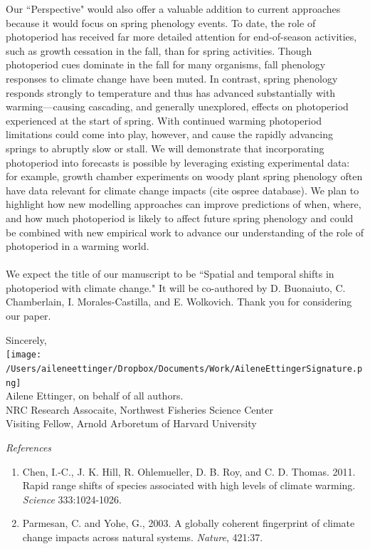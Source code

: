 \documentclass[10.5pt,a4paper]{letter}
\begin{document}
\begin{letter}{}
Our ``Perspective" would also offer a valuable addition to current approaches because it would focus on spring phenology events. To date, the role of photoperiod has received far more detailed attention for end-of-season activities, such as growth cessation in the fall, than for spring activities. Though photoperiod cues dominate in the fall for many organisms, fall phenology responses to climate change have been muted. In contrast, spring phenology responds strongly to temperature and thus has advanced substantially with warming---causing cascading, and generally unexplored, effects on photoperiod experienced at the start of spring. With continued warming photoperiod limitations could come into play, however, and cause the rapidly advancing springs to abruptly slow or stall. We will demonstrate that incorporating photoperiod into forecasts is possible by leveraging existing experimental data: for example, growth chamber experiments on woody plant spring phenology often have data relevant for climate change impacts (cite ospree database). We plan to highlight how new modelling approaches can improve predictions of when, where, and how much photoperiod is likely to affect future spring phenology and could be combined with new empirical work to advance our understanding of the role of photoperiod in a warming world. 
\\
\\
We expect the title of our manuscript to be ``Spatial and temporal shifts in photoperiod with climate change."  It will be co-authored by D. Buonaiuto, C. Chamberlain, I. Morales-Castilla, and E. Wolkovich. Thank you for considering our paper.

Sincerely,\\

\texttt{[image: /Users/aileneettinger/Dropbox/Documents/Work/AileneEttingerSignature.png]} \\
Ailene Ettinger, on behalf of all authors.
\\
NRC Research Assocaite, Northwest Fisheries Science Center
\\
Visiting Fellow, Arnold Arboretum of Harvard University

\noindent \emph{References}
\begin{footnotesize}
\begin{enumerate}
\item Chen, I.-C., J. K. Hill, R. Ohlemueller, D. B. Roy, and C. D. Thomas. 2011. Rapid range shifts of species associated with high levels of climate warming.  \emph{Science} 333:1024-1026.
\item Parmesan, C. and Yohe, G., 2003. A globally coherent fingerprint of climate change impacts across natural systems.  \emph{Nature}, 421:37.


\end{enumerate}
\end{footnotesize}
\end{letter}
\end{document}
